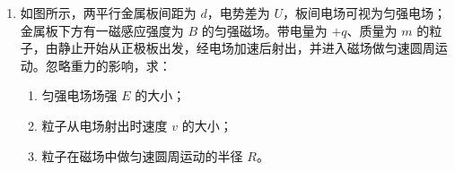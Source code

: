 \documentclass[\gkver]{gaokaozhenti}
\begin{document}
\begin{enumerate}
\begin{enumerate}
	\item
	若在（1）问中选用甲电路，产生误差的主要原因是；若在（1）问中选用乙电路，产生误差的主要原因是。（选填选项前的字母）

	（A）电流表测量值小于流经 $R_{x}$ 的电流值

	（B）电流表测量值大于流经 $R_{x}$ 的电流值

	（C）电压表测量值小于 $R_{x}$ 两端的电压值

	（D）电压表测量值大于 $R_{x}$ 两端的电压值

	\item
	在不损坏电表的前提下，将滑动变阻器滑片 $P$ 从一端滑向另一端，随滑片 $P$ 移动距离 $x$ 的增加，被测电阻 $R_{x}$ 两端的电压 $U$ 也随之增加，下列反映 $U-x$ 关系的示意图中正确的是。

\end{enumerate}

\item
如图所示，两平行金属板间距为 $d$，电势差为 $U$，板间电场可视为匀强电场；金属板下方有一磁感应强度为 $B$ 的匀强磁场。带电量为 $+q$、质量为 $m$ 的粒子，由静止开始从正极板出发，经电场加速后射出，并进入磁场做匀速圆周运动。忽略重力的影响，求：
\begin{enumerate}
	\item
	匀强电场场强 $E$ 的大小；
	\item
	粒子从电场射出时速度 $v$ 的大小；
	\item
	粒子在磁场中做匀速圆周运动的半径 $R$。
\end{enumerate}
\end{enumerate}
\end{document}
